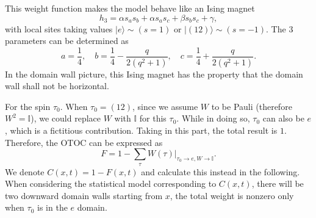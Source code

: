 \documentclass{SciPost}
\begin{document}
This weight function makes the model behave like an Ising magnet 
\begin{equation*}
	h_3 = \alpha s_a s_b + \alpha s_a s_c + \beta s_b s_c + \gamma,
\end{equation*}
with local sites taking values $|e\rangle \sim (s=1)$ or $|(12)\rangle \sim (s=-1)$.
The 3 parameters can be determined as
\begin{equation*}
	a = \frac{1}{4},\quad
	b = \frac{1}{4}-\frac{q}{2(q^2+1)},\quad
	c = \frac{1}{4}+\frac{q}{2(q^2+1)}.
\end{equation*}
In the domain wall picture, this Ising magnet has the property that the domain wall shall not be horizontal.

For the spin $\tau_0$. When $\tau_0 = (12)$, since we assume $W$ to be Pauli (therefore $W^2=\mathbb I$), we could replace $W$ with $\mathbb I$ for this $\tau_0$. 
While in doing so, $\tau_0$ can also be $e$, which is a fictitious contribution.
Taking in this part, the total result is $1$.
Therefore, the OTOC can be expressed as
\begin{equation}
	F = 1 - \sum_{\tau} \left.W(\tau)\right|_{\tau_0\rightarrow e,W\rightarrow\mathbb I}.
\end{equation}
We denote $C(x,t) = 1 - F(x,t)$ and calculate this instead in the following.
When considering the statistical model corresponding to $C(x,t)$, there will be two downward domain walls starting from $x$, the total weight is nonzero only when $\tau_0$ is in the $e$ domain.
\end{document}
